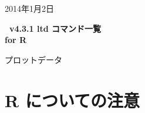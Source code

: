 \documentclass[a4j]{ujarticle}
\begin{document}
\begin{flushright}
2014年1月2日
\end{flushright}

\begin{center}
{\bf \huge \ketpic\ v4.3.1 ltd コマンド一覧}\vspace{3mm}\\
{\bf \huge for R}
\end{center}

\hfill
\begin{minipage}{4cm}
プロットデータ\\
\end{minipage}


\section{R についての注意}
\end{document}
